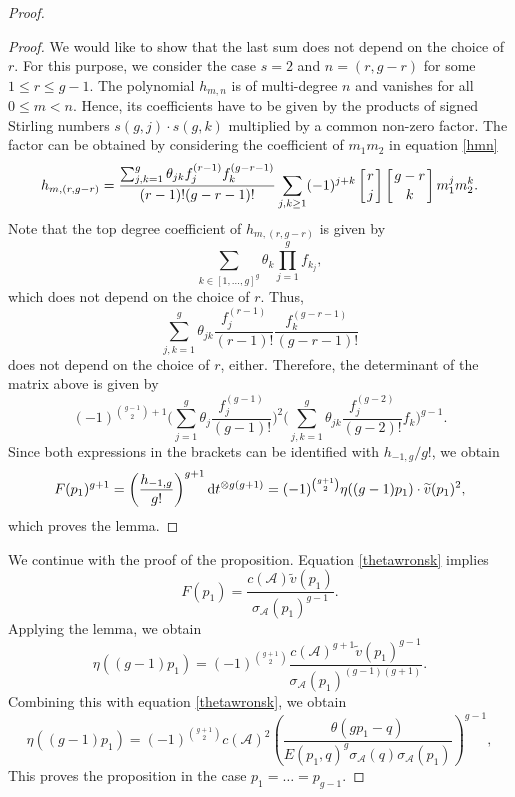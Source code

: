 \documentclass[10pt,a4paper]{amsart}
\numberwithin{equation}{section}
\newcommand\gf[2]{\genfrac{}{}{0pt}{}{#1}{#2}}
\begin{document}
\begin{proof}
\begin{proof}
		We would like to show that the last sum does not depend on the choice of $r$. For this purpose, we consider the case $s=2$ and $n=(r,g-r)$ for some $1\le r\le g-1$. The polynomial $h_{m,n}$ is of multi-degree $n$ and vanishes for all $0\le m<n$. Hence, its coefficients have to be given by the products of signed Stirling numbers $s(g,j)\cdot s(g,k)$ multiplied by a common non-zero factor. The factor can be obtained by considering the coefficient of $m_1 m_2$ in equation \eqref{hmn}
		\begin{align*}
			h_{m,(r,g-r)}=\frac{\sum_{j,k=1}^g\theta_{jk}f_j^{(r-1)}f_k^{(g-r-1)}}{(r-1)!(g-r-1)!}\sum_{j,k\ge 1}(-1)^{j+k}\left[\gf{r}{j}\right]\left[\gf{g-r}{k}\right]m_1^j m_2^k.
		\end{align*}
		Note that the top degree coefficient of $h_{m,(r,g-r)}$ is given by
		\[\sum_{k\in[1,\dots,g]^g}\theta_k\prod_{j=1}^g f_{k_j},\]
		which does not depend on the choice of $r$. Thus,
		\[\sum_{j,k=1}^g\theta_{jk}\frac{f_j^{(r-1)}}{(r-1)!}\frac{f_k^{(g-r-1)}}{(g-r-1)!}\]
		does not depend on the choice of $r$, either. Therefore, the determinant of the matrix above is given by
		\[(-1)^{\binom{g-1}{2}+1}\Biggl(\sum_{j=1}^g\theta_j\frac{f_j^{(g-1)}}{(g-1)!}\Biggr)^2\Biggl(\sum_{j,k=1}^g\theta_{jk}\frac{f_j^{(g-2)}}{(g-2)!}f_k\Biggr)^{g-1}.\]
		Since both expressions in the brackets can be identified with $h_{-1,g}/g!$, we obtain
		\[F(p_1)^{g+1}=\left(\frac{h_{-1,g}}{g!}\right)^{g+1}{\rm d}t^{\otimes g(g+1)}=(-1)^{\binom{g+1}{2}}\eta((g-1)p_1)\cdot\widetilde{v}(p_1)^2,\]
		which proves the lemma.
	\end{proof}

	We continue with the proof of the proposition. Equation \eqref{thetawronsk} implies
	\[F(p_1)=\frac{c(\mathcal{A})\widetilde{v}(p_1)}{\sigma_{\mathcal{A}}(p_1)^{g-1}}.\]
	Applying the lemma, we obtain
	\[\eta((g-1)p_1)=(-1)^{\binom{g+1}{2}}\frac{c(\mathcal{A})^{g+1}\widetilde{v}(p_1)^{g-1}}{\sigma_{\mathcal{A}}(p_1)^{(g-1)(g+1)}}.\]
	Combining this with equation \eqref{thetawronsk}, we obtain
	\[\eta((g-1)p_1)=(-1)^{\binom{g+1}{2}}c(\mathcal{A})^2\left(\frac{\theta(gp_1-q)}{E(p_1,q)^{g}\sigma_{\mathcal{A}}(q)\sigma_{\mathcal{A}}(p_1)}\right)^{g-1},\]
	This proves the proposition in the case $p_1=\dots=p_{g-1}$.
	

\end{proof}
\end{document}
